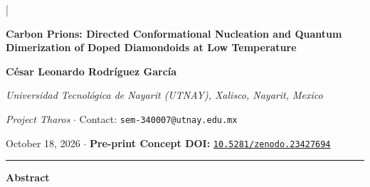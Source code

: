 \documentclass[10pt,twocolumn,a4paper]{article}
\begin{document}
\twocolumn[
  \begin{@twocolumnfalse}
    \vspace{-0.5cm}
    {\centering
      {\LARGE \textbf{Carbon Prions: Directed Conformational Nucleation and Quantum Dimerization of Doped Diamondoids at Low Temperature} \par}
      \vspace{0.85em}
      {\large \textbf{César Leonardo Rodríguez García} \par}
      \vspace{0.3em}
      {\small \textit{Universidad Tecnológica de Nayarit (UTNAY), Xalisco, Nayarit, Mexico} \par}
      \vspace{0.15em}
      {\footnotesize \textit{Project Tharos} $\cdot$ Contact: \texttt{sem-340007@utnay.edu.mx} \par}
      \vspace{0.25em}
      {\footnotesize October 18, 2026 $\cdot$ \textbf{Pre-print Concept DOI:} \href{https://doi.org/10.5281/zenodo.23427694}{\texttt{10.5281/zenodo.23427694}} \par}
      \vspace{0.65em}
    }
    \hrule
    \vspace{0.55em}
    \noindent\textbf{\large Abstract}
    \vspace{0.35em}


\end{@twocolumnfalse}
\end{document}
